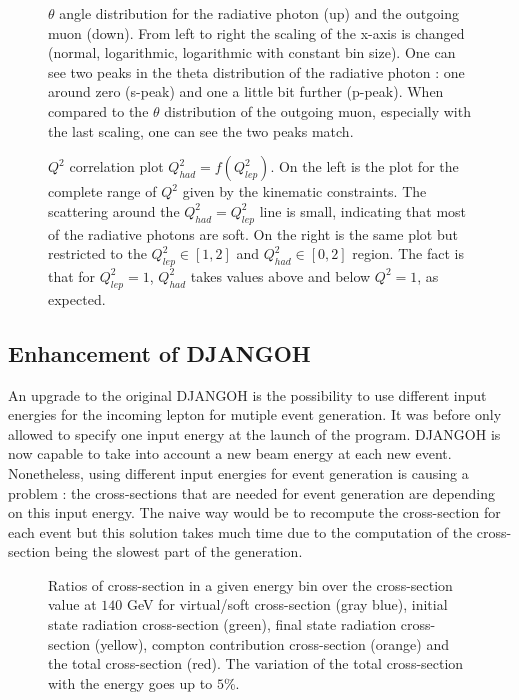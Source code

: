 \begin{figure}[htb]
\centerline{}
\caption{$\theta$ angle distribution for the radiative photon (up) and the outgoing muon (down). From left to right the scaling of the x-axis is changed (normal, logarithmic, logarithmic with constant bin size). One can see two peaks in the theta distribution of the radiative photon : one around zero (s-peak) and one a little bit further (p-peak). When compared to the $\theta$ distribution of the outgoing muon, especially with the last scaling, one can see the two peaks match.}\label{fig:anglesp}
 \end{figure}
\hfill
\begin{figure}[htb]
\centerline{}
\caption{$Q^2$ correlation plot $Q^2_{had}=f(Q^2_{lep})$. On the left is the plot for the complete range of $Q^2$
given by the kinematic constraints. The scattering around the $Q^2_{had} = Q^2_{lep}$ line is small, indicating that
most of the radiative photons are soft. On the right is the same plot but restricted to the $Q^2_{lep}\in[1,2]$ and
$Q^2_{had}\in[0,2]$ region. The fact is that for $Q^2_{lep}=1$, $Q^2_{had}$ takes values above and below $Q^2=1$, as expected.}\label{fig:Q2corr}
\end{figure}

\subsection{Enhancement of DJANGOH}

An upgrade to the original DJANGOH is the possibility to use different input energies for the incoming lepton for mutiple event generation. It was before only allowed to specify one input energy at the launch of the program. DJANGOH is now capable to take into account a new beam energy at each new event. Nonetheless, using different input energies for event generation is causing a problem : the cross-sections that are needed for event generation are depending on this input energy. The naive way would be to recompute the cross-section for each event but this solution takes much time due to the computation of the cross-section being the slowest part of the generation.

\begin{figure}[htb]
\centerline{}
\caption{Ratios of cross-section in a given energy bin over the cross-section value at $140$ GeV for virtual/soft cross-section (gray blue), initial state radiation cross-section (green), final state radiation cross-section (yellow), compton contribution cross-section (orange) and the total cross-section (red). The variation of the total cross-section with the energy goes up to $5$\%.}\label{fig:gridxs}
\end{figure}

